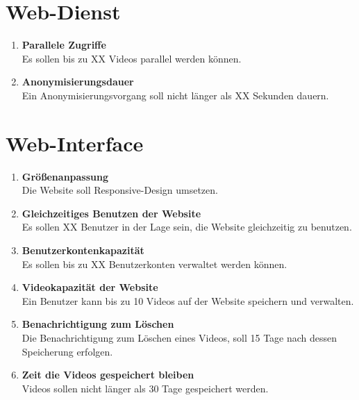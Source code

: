 \section{\gls{Web-Dienst}}
\begin{enumerate}
\renewcommand{\labelenumi}{\textbf{\theenumi}}
\renewcommand{\theenumi}{NA\arabic{enumi}0}
\setcounter{enumi}{199}

\item \label{na:paralleleZugriffe}\textbf{Parallele Zugriffe} \hfill\\  Es sollen bis zu XX Videos parallel  werden können.

\item \textbf{Anonymisierungsdauer} \hfill\\  Ein Anonymisierungsvorgang soll nicht länger als XX Sekunden dauern.
\end{enumerate}

\section{\gls{Web-Interface}}
\begin{enumerate}
\renewcommand{\labelenumi}{\textbf{\theenumi}}
\renewcommand{\theenumi}{NA\arabic{enumi}0}
\setcounter{enumi}{299}

\item \textbf{Größenanpassung} \hfill\\  Die Website soll \gls{Responsive-Design} umsetzen.

\item \textbf{Gleichzeitiges Benutzen der Website} \hfill\\  Es sollen XX Benutzer in der Lage sein, die Website gleichzeitig zu benutzen.

\item \textbf{Benutzerkontenkapazität} \hfill\\  Es sollen bis zu XX Benutzerkonten verwaltet werden können.

\item \label{na:VideoKap}\textbf{Videokapazität der Website} \hfill\\  Ein Benutzer kann bis zu 10 Videos auf der Website speichern und verwalten.

\item \textbf{Benachrichtigung zum Löschen} \hfill\\  Die Benachrichtigung zum Löschen eines Videos, soll 15 Tage nach dessen Speicherung erfolgen.

\item \textbf{Zeit die Videos gespeichert bleiben} \hfill\\  Videos sollen nicht länger als 30 Tage gespeichert werden.
\end{enumerate}





